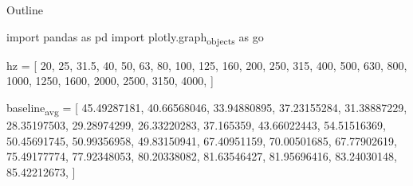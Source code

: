 \documentclass[presentation]{beamer}
\author{Michael Raba}
\date{\today}
\title{}
\begin{document}
\begin{frame}{Outline}
\tableofcontents
\end{frame}

import pandas as pd
import plotly.graph\textsubscript{objects} as go

hz = [
    20,
    25,
    31.5,
    40,
    50,
    63,
    80,
    100,
    125,
    160,
    200,
    250,
    315,
    400,
    500,
    630,
    800,
    1000,
    1250,
    1600,
    2000,
    2500,
    3150,
    4000,
]

baseline\textsubscript{avg} = [
    45.49287181,
    40.66568046,
    33.94880895,
    37.23155284,
    31.38887229,
    28.35197503,
    29.28974299,
    26.33220283,
    37.165359,
    43.66022443,
    54.51516369,
    50.45691745,
    50.99356958,
    49.83150941,
    67.40951159,
    70.00501685,
    67.77902619,
    75.49177774,
    77.92348053,
    80.20338082,
    81.63546427,
    81.95696416,
    83.24030148,
    85.42212673,
]
\end{document}
